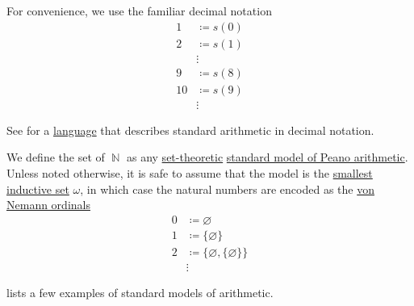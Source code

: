 \begin{definition}
  For convenience, we use the familiar decimal notation
  \begin{align*}
    1  &\coloneqq s(0) \\
    2  &\coloneqq s(1) \\
       &\vdots \\
    9  &\coloneqq s(8) \\
    10 &\coloneqq s(9) \\
       &\vdots
  \end{align*}

  See  for a \hyperref[def:language]{language} that describes standard arithmetic in decimal notation.
\end{definition}

\begin{definition}\label{def:natural_numbers}
  We define the set of  \( \BbbN \) as any \hyperref[sec:set_theory]{set-theoretic} \hyperref[def:peano_arithmetic]{standard model of Peano arithmetic}. Unless noted otherwise, it is safe to assume that the model is the \hyperref[def:smallest_inductive_set]{smallest inductive set} \( \omega \), in which case the natural numbers are encoded as the \hyperref[ex:natural_numbers_models/omega]{von Nemann ordinals}
  \begin{align*}
    0 &\coloneqq \varnothing \\
    1 &\coloneqq \{ \varnothing \} \\
    2 &\coloneqq \{ \varnothing, \{ \varnothing \} \} \\
      &\vdots
  \end{align*}

   lists a few examples of standard models of arithmetic.
\end{definition}

